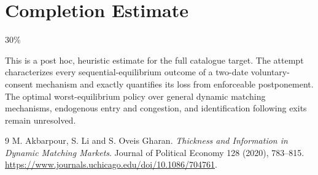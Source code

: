 \documentclass[11pt]{article}
\theoremstyle{definition}
\begin{document}
\section{Completion Estimate}
30\%

This is a post hoc, heuristic estimate for the full catalogue target.
The attempt characterizes every sequential-equilibrium outcome of a two-date voluntary-consent mechanism and exactly quantifies its loss from enforceable postponement. The optimal worst-equilibrium policy over general dynamic matching mechanisms, endogenous entry and congestion, and identification following exits remain unresolved.

\begin{thebibliography}{9}
 M. Akbarpour, S. Li and S. Oveis Gharan.
\emph{Thickness and Information in Dynamic Matching Markets}.
Journal of Political Economy 128 (2020), 783--815.
\url{https://www.journals.uchicago.edu/doi/10.1086/704761}.
\end{thebibliography}
\end{document}
